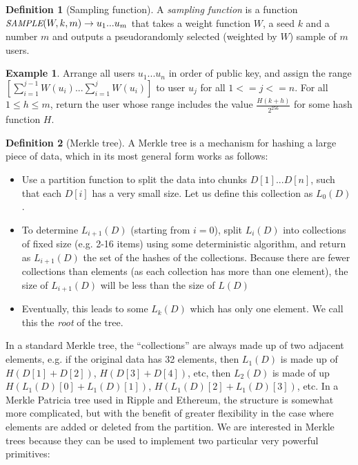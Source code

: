 \documentclass[11pt,a4paper]{article}
\makeatletter
\theoremstyle{plain}
\theoremstyle{definition}
\newtheorem{defn}{Definition}[section]
\newtheorem{exmp}{Example}[section]
\theoremstyle{remark}
\newcommand{\eg}{e.g.\@\xspace}
\newcommand{\makeintoafunction}[1]{\textit{\uppercase{\small #1}}}
\newcommand{\SAMPLE}{\makeintoafunction{sample}}
\makeatother
\begin{document}
\begin{defn}[Sampling function]
A \emph{sampling function} is a function $\SAMPLE(W, k, m) \rightarrow {u_1 ... u_m}$ that takes a weight function $W$, a seed $k$ and a number $m$ and outputs a pseudorandomly selected (weighted by $W$) sample of $m$ users.
\end{defn}

\begin{exmp}
Arrange all users $u_1 ... u_n$ in order of public key, and assign the range $[\sum_{i=1}^{j-1} W(u_i)...\sum_{i=1}^j W(u_i)]$ to user $u_j$ for all $1 <= j <= n$. For all $1 \le h \le m$, return the user whose range includes the value $\frac{H(k + h)}{2^{256}}$ for some hash function $H$.
\end{exmp}

\begin{defn}[Merkle tree]
A Merkle tree\cite{merkle} is a mechanism for hashing a large piece of data, which in its most general form works as follows:
\begin{itemize}
\item
Use a partition function to split the data into chunks $D[1] ... D[n]$, such that each $D[i]$ has a very small size. Let us define this collection as $L_0(D)$.
\item
To determine $L_{i+1}(D)$ (starting from $i = 0$), split $L_i(D)$ into collections of fixed size (\eg 2-16 items) using some deterministic algorithm, and return as $L_{i+1}(D)$ the set of the hashes of the collections. Because there are fewer collections than elements (as each collection has more than one element), the size of $L_{i+1}(D)$ will be less than the size of $L(D)$
\item
Eventually, this leads to some $L_k(D)$ which has only one element. We call this the \emph{root} of the tree.
\end{itemize}
\end{defn}

In a standard Merkle tree, the ``collections'' are always made up of two adjacent elements, \eg if the original data has 32 elements, then $L_1(D)$ is made up of $H(D[1] + D[2])$, $H(D[3] + D[4])$, etc, then $L_2(D)$ is made of up $H(L_1(D)[0] + L_1(D)[1])$, $H(L_1(D)[2] + L_1(D)[3])$, etc. In a Merkle Patricia tree\cite{mpt} used in Ripple and Ethereum, the structure is somewhat more complicated, but with the benefit of greater flexibility in the case where elements are added or deleted from the partition. We are interested in Merkle trees because they can be used to implement two particular very powerful primitives:
\end{document}
